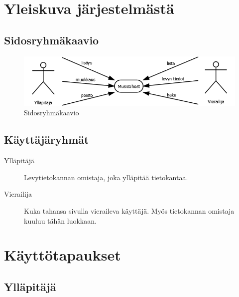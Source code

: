 \documentclass[a4paper,12pt]{report}
\begin{document}
\section{Yleiskuva järjestelmästä}

\subsection{Sidosryhmäkaavio}

\vspace{1em}
\begin{figure}[H]
  \begin{center}
    \includegraphics[width=\textwidth]{diagrams/sidosryhmakaavio}
  \end{center}
  \caption{Sidosryhmäkaavio}
\end{figure}

\subsection{Käyttäjäryhmät}

\begin{description}
  \item[Ylläpitäjä] Levytietokannan omistaja, joka ylläpitää tietokantaa.
  \item[Vierailija] Kuka tahansa sivulla vieraileva käyttäjä. Myös
    tietokannan omistaja kuuluu tähän luokkaan.
\end{description}

\section{Käyttötapaukset}

\subsection{Ylläpitäjä}
\end{document}
